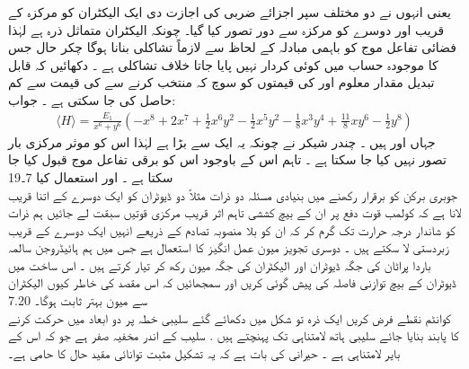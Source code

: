 یعنی انہوں نے دو مختلف سپر اجزائے ضربی کی اجازت دی ایک الیکٹران کو مرکزہ کے قریب اور دوسرے کو مرکزہ سے دور تصور کیا گیا۔ چونکہ الیکٹران متماثل ذرہ ہے لہٰذا فضائی تفاعل موج کو باہمی مبادلہ کے لحاظ سے لازماً تشاکلی بنانا ہوگا چکر حال جس کا موجودہ حساب میں کوئی کردار نہیں پایا جاتا خلاف تشاکلی ہے ۔ دکھائیں کہ قابل تبدیل مقدار معلوم  اور  کی قیمتوں کو سوچ کہ منتخب کرنے سے  کی قیمت  سے کم حاصل کی جا سکتی ہے ۔
جواب:
\begin{align}
\langle H \rangle = \frac{E_{1}}{x^{6}+y^{6}}(-x^{8}+2x^{7}+\frac{1}{2}x^{6}y^{2}-\frac{1}{2}x^{5}y^{2}-\frac{1}{8}x^{3}y^{4}+\frac{11}{8}xy^{6}-\frac{1}{2}y^{8})
\end{align}
 جہاں  اور  ہیں ۔ چندر شیکر نے  چونکہ یہ ایک سے بڑا ہے لہٰذا اس کو موثر مرکزی بار تصور نہیں کیا جا سکتا ہے ۔ تاہم اس کے باوجود اس کو برقی تفاعل موج قبول کیا جا سکتا ہے ۔ اور  استعمال کیا
7۔19\\
جوبری برکن کو برقرار رکھنے میں بنیادی مسئلہ دو ذرات مثلاً دو ڈیوٹران کو ایک دوسرے کے اتنا قریب لانا ہے کہ کولمب قوت دفع پر ان کے بیچ کششی تاہم اثر قریب مرکزی قوتیں سبقت لے جائیں ہم ذرات کو شاندار درجہ حرارت تک گرم کر کہ ان کو بلا منصوبہ  تصادم کے ذریعے انہیں ایک دوسرے کے قریب زبردستی لا سکتے  ہیں ۔ دوسری تجویز میون عمل انگیز کا استعمال ہے جس میں ہم ہائیڈروجن سالمہ باردا پراٹان کی جگہ ڈیوٹران اور الیکٹران کی جگہ میون رکھ کر تیار کرتے ہیں ۔ اس ساخت میں ڈیوٹران کے بیچ توازنی فاصلہ کی پیش گوئی کریں   اور سمجھائیں کہ اس مقصد کی خاطر کیوں الیکٹران سے میون بہتر ثابت ہوگا۔
7.20\\
کوانٹم نقطے فرض کریں ایک ذرہ تو شکل  میں دکھائے گئے سلیبی خطہ پر دو ابعاد میں حرکت کرنے کا پابند بنایا جائے سلیبی ہاتھ لامتناہی تک پہنچتے ہیں . سلیب کے اندر مخفیہ صفر ہے جو کہ اس کے بایر لامتناہی ہے ۔ حیرانی کی بات ہے کہ یہ تشکیل مثبت توانائی مقید حال کا حامی ہے۔

